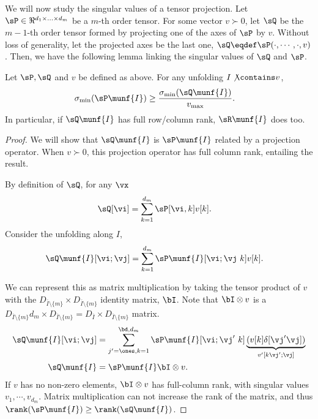 We will now study the singular values of a tensor projection. 
Let $\sP \in \Re^{d_1 \times \ldots \times d_m}$ be a $m$-th order
  tensor. 
For some vector $v \succ 0$, let $\sQ$ be the $m-1$-th order tensor
  formed by projecting one of the axes of $\sP$ by $v$. 
Without loss of generality, let the projected axes be the last one, $\sQ
  \eqdef \sP(\cdot, \cdots, \cdot, v)$.
Then, we have the following lemma linking the singular values of $\sQ$
  and $\sP$.
\begin{lemma}
  \label{lem:tensor-projection}
  Let $\sP, \sQ$ and $v$ be defined as above. For any unfolding $I
  \not\contains v$, 
\begin{align*}
  \sigma_{\min}(\sP\munf{I}) &\ge \frac{\sigma_{\min}(\sQ\munf{I})}{v_{\max}}.
\end{align*}
In particular, if $\sQ\munf{I}$ has full row/column rank, $\sR\munf{I}$
  does too.
\end{lemma}
\begin{proof}
  We will show that $\sQ\munf{I}$ is $\sP\munf{I}$ related by
  a projection operator. When $v \succ 0$, this projection operator has
  full column rank, entailing the result.

  By definition of $\sQ$, for any $\vx$
  \begin{align*}
    \sQ[\vi] &= \sum_{k=1}^{d_m} \sP[\vi, k] v[k].
  \end{align*}
  Consider the unfolding along $I$,
  \begin{align*}
    \sQ\munf{I}[\vi;\vj] &= \sum_{k=1}^{d_m} \sP\munf{I}[\vi;\vj\ k] v[k].
  \end{align*}

  We can represent this as matrix multiplication by taking the tensor
  product of $v$ with the $D_{\bar I \setminus \{m\}} \times D_{\bar
  I \setminus \{m\}}$ identity matrix, $\bI$. Note that $\bI \otimes v$ is a $
  D_{\bar I \setminus \{m\}} d_m \times D_{\bar I \setminus \{m\}}
  = D_{\bar I } \times D_{\bar I \setminus \{m\}}$ matrix.
  \begin{align*}
    \sQ\munf{I}[\vi;\vj] 
    &= \sum_{j'=\ones, k=1}^{\bd, d_m} \sP\munf{I}[\vi;\vj'\ k] \underbrace{(v[k] \delta[\vj' \vj])}_{v'[k \vj'; \vj]} \\
    \sQ\munf{I}
      &= \sP\munf{I} \bI \otimes v.
  \end{align*}
  If $v$ has no non-zero elements, $\bI \otimes v$ has full-column
  rank, with singular values $v_1, \cdots, v_{d_m}$. 
  Matrix multiplication can not increase the rank of the matrix, and
  thus $\rank(\sP\munf{I}) \ge \rank(\sQ\munf{I})$. 


\end{proof}



